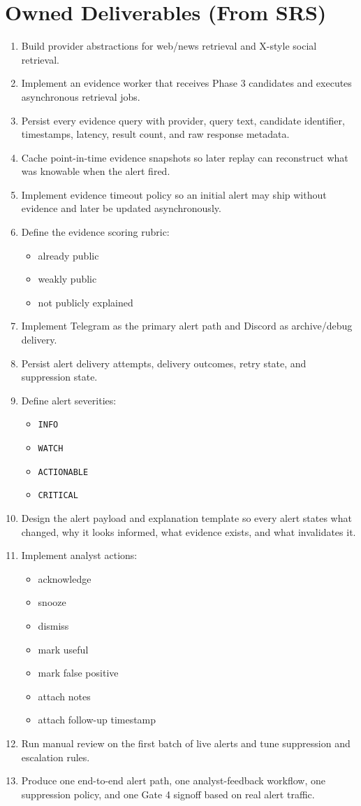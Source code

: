 \documentclass{article}
\begin{document}
\section*{Owned Deliverables (From SRS)}
\begin{enumerate}
\item Build provider abstractions for web/news retrieval and X-style social retrieval.
\item Implement an evidence worker that receives Phase 3 candidates and executes asynchronous retrieval jobs.
\item Persist every evidence query with provider, query text, candidate identifier, timestamps, latency, result count, and raw response metadata.
\item Cache point-in-time evidence snapshots so later replay can reconstruct what was knowable when the alert fired.
\item Implement evidence timeout policy so an initial alert may ship without evidence and later be updated asynchronously.
\item Define the evidence scoring rubric:
\begin{itemize}
\item already public
\item weakly public
\item not publicly explained
\end{itemize}
\item Implement Telegram as the primary alert path and Discord as archive/debug delivery.
\item Persist alert delivery attempts, delivery outcomes, retry state, and suppression state.
\item Define alert severities:
\begin{itemize}
\item \texttt{INFO}
\item \texttt{WATCH}
\item \texttt{ACTIONABLE}
\item \texttt{CRITICAL}
\end{itemize}
\item Design the alert payload and explanation template so every alert states what changed, why it looks informed, what evidence exists, and what invalidates it.
\item Implement analyst actions:
\begin{itemize}
\item acknowledge
\item snooze
\item dismiss
\item mark useful
\item mark false positive
\item attach notes
\item attach follow-up timestamp
\end{itemize}
\item Run manual review on the first batch of live alerts and tune suppression and escalation rules.
\item Produce one end-to-end alert path, one analyst-feedback workflow, one suppression policy, and one Gate 4 signoff based on real alert traffic.
\end{enumerate}
\end{document}
